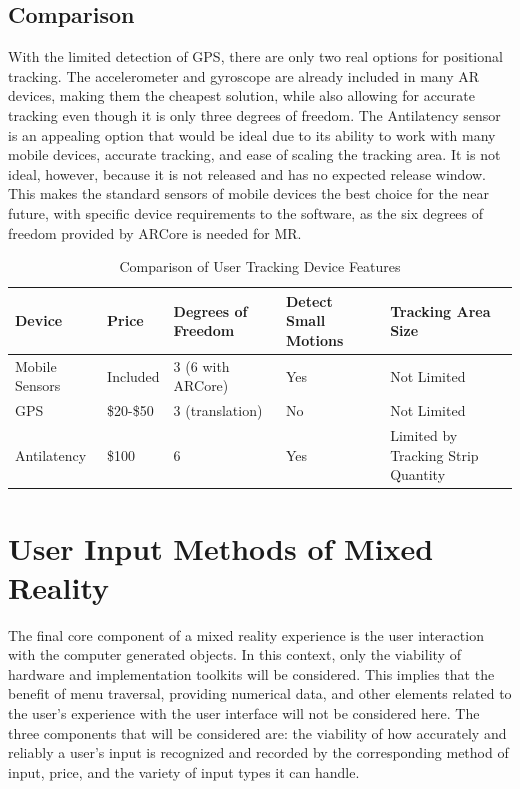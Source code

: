 \documentclass[10pt,draftclsnofoot,onecolumn,letterpaper]{IEEEtran}
\begin{document}
\subsection{Comparison}

With the limited detection of GPS, there are only two real options for positional tracking. The accelerometer and gyroscope are already included in many AR devices, making them the cheapest solution, while also allowing for accurate tracking even though it is only three degrees of freedom. The Antilatency sensor is an appealing option that would be ideal due to its ability to work with many mobile devices, accurate tracking, and ease of scaling the tracking area. It is not ideal, however, because it is not released and has no expected release window. This makes the standard sensors of mobile devices the best choice for the near future, with specific device requirements to the software, as the six degrees of freedom provided by ARCore is needed for MR.\par

\begin{table}[ht]
\begin{center}
\caption{Comparison of User Tracking Device Features}
\label{table:2}
 \begin{tabular}{|p{3cm}|p{2cm}|p{3cm}|p{4cm}|p{3cm}|} 
 \hline
 Device & Price & Degrees of Freedom & Detect Small Motions & Tracking Area Size \\ [0.5ex] 
 \hline\hline
 Mobile Sensors & Included & 3 (6 with ARCore) & Yes & Not Limited \\ 
 \hline
 GPS & \$20-\$50 & 3 (translation) & No & Not Limited \\
 \hline
 Antilatency & \$100 & 6 & Yes & Limited by Tracking Strip Quantity \\
 \hline
\end{tabular}
\end{center}
\end{table}

\section{User Input Methods of Mixed Reality}
The final core component of a mixed reality experience is the user interaction with the computer generated objects. In this context, only the viability of hardware and implementation toolkits will be considered. This implies that the benefit of menu traversal, providing numerical data, and other elements related to the user's experience with the user interface will not be considered here. The three components that will be considered are: the viability of how accurately and reliably a user's input is recognized and recorded by the corresponding method of input, price, and the variety of input types it can handle.\par
\end{document}
